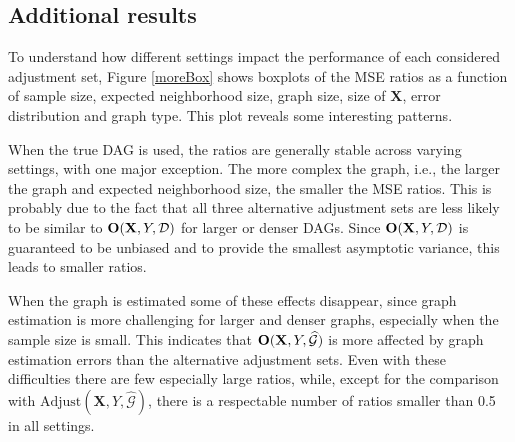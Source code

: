 \documentclass[11pt,a4paper]{article}
\theoremstyle{definition}
\theoremstyle{remark}
\newcommand{\g}[1][G]{\mathcal{#1}}
\begin{document}






\subsection{Additional results}
\label{resultsMSE}






To understand how different settings impact the performance of each considered adjustment set,  Figure \ref{moreBox} shows boxplots of the MSE ratios as a function of sample size, expected neighborhood size, graph size, size of $\mathbf{X}$, error distribution and graph type. This plot reveals some interesting patterns. 


When the true DAG is used, the ratios are generally stable across varying settings, with one major exception. The more complex the graph, i.e., the larger the graph and expected neighborhood size, the smaller the MSE ratios. This is probably due to the fact that all three alternative adjustment sets are less likely to be similar to $\text{\textbf{O}}(\mathbf{X},Y,\g[D])$ for larger or denser DAGs. Since $\text{\textbf{O}}(\mathbf{X},Y,\g[D])$ is guaranteed to be unbiased and to provide the smallest asymptotic variance, this leads to smaller ratios. 

When the graph is estimated some of these effects disappear, since graph estimation is more challenging for larger and denser graphs, especially when the sample size is small. This indicates that $\text{\textbf{O}}(\mathbf{X},Y,\widehat{\g})$ is more affected by graph estimation errors than the alternative adjustment sets. Even with these difficulties there are few especially large ratios, while, except for the comparison with $\textrm{Adjust}(\mathbf{X},Y,\widehat{\g})$, there is a respectable number of ratios smaller than 0.5 in all settings. 
\end{document}
